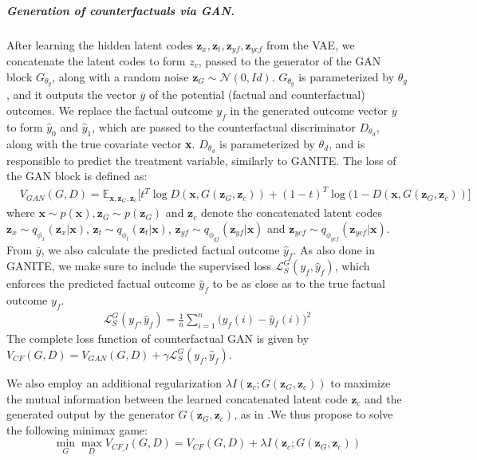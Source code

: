 \documentclass{amia}
\begin{document}
\subparagraph{Generation of counterfactuals via GAN.}
After learning the hidden latent codes $\textbf{z}_x, \textbf{z}_t, \textbf{z}_{yf}, \textbf{z}_{ycf}$ from the VAE, we concatenate the latent codes to form $z_c$, passed to the generator of the GAN block $G_{\theta_g}$, along with a random noise $\textbf{z}_G \sim \mathcal{N}(0, Id)$. $G_{\theta_g}$ is parameterized by $\theta_g$, and it outputs the vector $\overline{y}$ of the potential (factual and counterfactual) outcomes. We replace the factual outcome $y_f$ in the generated outcome vector $\overline{y}$ to form $\hat{y}_0$ and $\hat{y}_1$, which are passed to the counterfactual discriminator $D_{\theta_d}$, along with the true covariate vector \textbf{x}.  $D_{\theta_d}$ is parameterized by $\theta_d$, and is responsible to predict the treatment variable, similarly to GANITE. The loss of the GAN block is defined as:
\begin{align*}
    & V_{GAN} (G, D) = \mathbb{E}_{\textbf{x}, \textbf{z}_G, \textbf{z}_c}\big[t^T\log D(\textbf{x}, G(\textbf{z}_G, \textbf{z}_c)) 
    + (1 - t)^T \log(1 - D(\textbf{x}, G(\textbf{z}_G, \textbf{z}_c)) \big]
    \label{equ:V_CF}
\end{align*}
where $\textbf{x} \sim p(\textbf{x}), \textbf{z}_G \sim p(\textbf{z}_G)$ and $\textbf{z}_c$ denote the concatenated latent codes 
$\textbf{z}_x \sim q_{\phi_x}(\textbf{z}_x|\textbf{x})$, $\textbf{z}_t \sim q_{\phi_t}(\textbf{z}_t|\textbf{x})$, $\textbf{z}_{yf} \sim q_{\phi_{yf}}(\textbf{z}_{yf}|\textbf{x})$ and 
$\textbf{z}_{ycf} \sim q_{\phi_{ycf}}(\textbf{z}_{ycf}|\textbf{x})$.
From $\overline{y}$, we also calculate the predicted factual outcome $\hat{y}_f$. As also done in GANITE, we make sure to include the supervised loss $\mathcal{L}_S^G(y_f, \hat{y}_f)$, which enforces the predicted factual outcome $\hat{y}_f$ to be as close as to the true factual outcome $y_f$.
\begin{align}
    \mathcal{L}_S^G(y_f, \hat{y}_f) = \frac{1}{n} \sum_{i = 1}^n \big(y_f(i) - \hat{y}{_f(i)}\big)^2 
\end{align}
The complete loss function of counterfactual GAN is given by $V_{CF} (G, D) = V_{GAN} (G, D) + \gamma \mathcal{L}_S^G(y_f, \hat{y}_f)$.

We also employ an additional regularization $\lambda I(\textbf{z}_c; G(\textbf{z}_G, \textbf{z}_c))$ to maximize the mutual information between the learned concatenated latent code $\textbf{z}_c$ and the generated output by the generator $ G(\textbf{z}_G, \textbf{z}_c)$, as in \cite{chen2016infogan}.We thus propose to solve the following minimax game:
\begin{equation}
    \min_G \max_D V_{CF\_I} (G, D) = V_{CF}(G, D) + \lambda I(\textbf{z}_c; G(\textbf{z}_G, \textbf{z}_c))
\end{equation}
\end{document}
